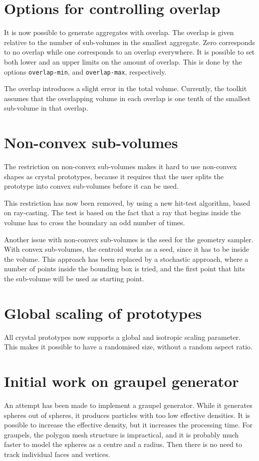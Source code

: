 \documentclass[a4paper,10pt]{scrartcl}
\begin{document}
\section{Options for controlling overlap}
It is now possible to generate aggregates with overlap. The overlap is given relative to the number of sub-volumes in the smallest aggregate. Zero corresponds to no overlap while one corresponds to an overlap everywhere. It is possible to set both lower and an upper limits on the amount of overlap. This is done by the options \texttt{overlap-min}, and \texttt{overlap-max}, respectively.

The overlap introduces a slight error in the total volume. Currently, the toolkit assumes that the overlapping volume in each overlap is one tenth of the smallest sub-volume in that overlap.

\section{Non-convex sub-volumes}
The restriction on non-convex sub-volumes makes it hard to use non-convex shapes as crystal prototypes, because it requires that the user splits the prototype into convex sub-volumes before it can be used.

This restriction has now been removed, by using a new hit-test algorithm, based on ray-casting. The test is based on the fact that a ray that begins inside the volume has to cross the boundary an odd number of times.

Another issue with non-convex sub-volumes is the seed for the geometry sampler. With convex sub-volumes, the centroid works as a seed, since it has to be inside the volume. This approach has been replaced by a stochastic approach, where a number of points inside the bounding box is tried, and the first point that hits the sub-volume will be used as starting point.

\section{Global scaling of prototypes}
All crystal prototypes now supports a global and isotropic scaling parameter. This makes it possible to have a randomised size, without a random aspect ratio.

\section{Initial work on graupel generator}
An attempt has been made to implement a graupel generator. While it generates spheres out of spheres, it produces particles with too low effective densities. It is possible to increase the effective density, but it increases the processing time. For graupels, the polygon mesh structure is impractical, and it is probably much faster to model the spheres as a centre and a radius. Then there is no need to track individual faces and vertices.
\end{document}
